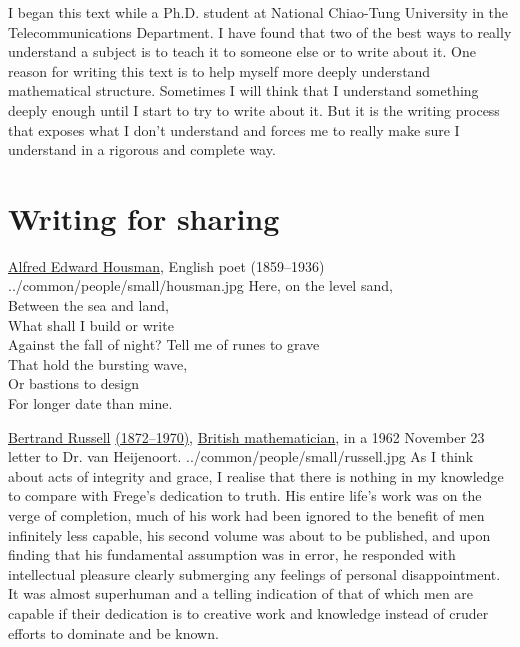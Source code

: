 \begin{personal}
  I began this text while a Ph.D. student at 
  National Chiao-Tung University in the Telecommunications Department.
  I have found that two of the best ways to really understand a subject
  is to teach it to someone else or to write about it. 
  One reason for writing this text is to help myself more deeply understand
  mathematical structure.
  Sometimes I will think that I understand something deeply 
  enough until I start to try to write about it. 
  But it is the writing process that exposes what I don't understand 
  and forces me to really make sure I understand in a rigorous and complete way.
  
  
\section*{Writing for sharing}
\qboxnpqt
  {  
    \href{http://en.wikipedia.org/wiki/Housman}{Alfred Edward Housman}, English poet (1859--1936)
    \footnotemark
  }
  {../common/people/small/housman.jpg}
  {Here, on the level sand, \\
    Between the sea and land, \\
    What shall I build or write \\
    Against the fall of night?
  }
  {Tell me of runes to grave \\
    That hold the bursting wave, \\
    Or bastions to design \\
    For longer date than mine.
  }

\qboxnpq
  { \href{http://en.wikipedia.org/wiki/Bertrand_Russell}{Bertrand Russell}
    \href{http://www-history.mcs.st-andrews.ac.uk/Timelines/TimelineF.html}{(1872--1970)},
    \href{http://www-history.mcs.st-andrews.ac.uk/BirthplaceMaps/Places/UK.html}{British mathematician},
    in a 1962 November 23 letter to Dr. van Heijenoort.
    \footnotemark
  }
  {../common/people/small/russell.jpg}
  {As I think about acts of integrity and grace,
   I realise that there is nothing in my knowledge to compare with Frege's dedication to truth.
   His entire life's work was on the verge of completion,
   much of his work had been ignored to the benefit of men infinitely less capable,
   his second volume was about to be published, and upon finding that his fundamental assumption
   was in error, 
   he responded with intellectual pleasure clearly submerging any feelings of personal disappointment.
   It was almost superhuman and a telling indication of that of which men are capable if their
   dedication is to creative work and knowledge instead of cruder efforts to dominate and be 
   known.}


\end{personal}
